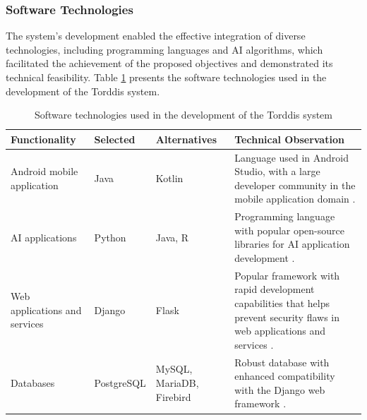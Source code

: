                 \subsubsection{Software Technologies}
                The system's development enabled the effective integration of diverse technologies, including programming languages and AI algorithms, which facilitated the achievement of the proposed objectives and demonstrated its technical feasibility. Table \ref{table:software-technologies} presents the software technologies used in the development of the Torddis system.
                
                \begin{table}[!htbp]
                    \caption{Software technologies used in the development of the Torddis system}
                    \label{table:software-technologies}
                    \centering
                    {\footnotesize
%
                        \begin{tabular}{
                                >{\raggedright\arraybackslash}p{}
                                >{\raggedright\arraybackslash}p{}
                                >{\raggedright\arraybackslash}p{}
                                >{\raggedright\arraybackslash}p{}
                            }
                            \toprule
                            \textbf{Functionality} &
                            \textbf{Selected} &
                            \textbf{Alternatives} &
                            \textbf{Technical Observation} \\
                            \midrule
                            
                            Android mobile application & Java & Kotlin & Language used in Android Studio, with a large developer community in the mobile application domain \citep{Sharma2021Real-Time}. \\
                            
                            AI applications & Python & Java, R & Programming language with popular open-source libraries for AI application development \citep{Cai2005OnThePerformance}. \\
                            
                            Web applications and services & Django & Flask & Popular framework with rapid development capabilities that helps prevent security flaws in web applications and services \citep{Puneet2022ADjango}. \\
                            
                            Databases & PostgreSQL & MySQL, MariaDB, Firebird & Robust database with enhanced compatibility with the Django web framework \citep{Puneet2022ADjango}. \\
                            
                            \bottomrule
                        \end{tabular}
                    }
                \end{table}
                
